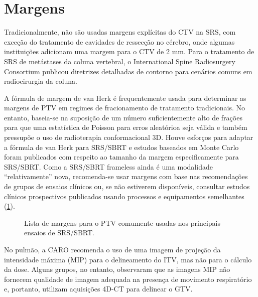 \documentclass[11pt,a4paper]{article}
\begin{document}
\section{Margens}

	Tradicionalmente, não são usadas margens explícitas do CTV na SRS, com exceção do tratamento de cavidades de ressecção no cérebro, onde algumas instituições adicionam uma margem para o CTV de 2 mm. Para o tratamento de SRS de metástases da coluna vertebral, o International Spine Radiosurgery Consortium publicou diretrizes detalhadas de contorno para cenários comuns em radiocirurgia da coluna. 

	A fórmula de margem de van Herk é frequentemente usada para determinar as margens de PTV em regimes de fracionamento de tratamento tradicionais. No entanto, baseia-se na suposição de um número suficientemente alto de frações para que uma estatística de Poisson para erros aleatórioa seja válida e também pressupõe o uso de radioterapia conformacional 3D. Houve esforços para adaptar a fórmula de van Herk para SRS/SBRT e estudos baseados em Monte Carlo\cite{herschtal2012calculating} foram publicados com respeito ao tamanho da margem especificamente para SRS/SBRT. Como a SRS/SBRT frameless ainda é uma modalidade ``relativamente'' nova, recomenda-se usar margens com base nas recomendações de grupos de ensaios clínicos ou, se não estiverem disponíveis, consultar estudos clínicos prospectivos publicados usando processos e equipamentos semelhantes (\ref{fig:srsMargens}).

	\begin{figure}[h]
		\centering
		\caption{Lista de margens para o PTV comumente usadas nos principais ensaios de SRS/SBRT.}
		\label{fig:srsMargens}
	\end{figure}

	No pulmão, a CARO recomenda o uso de uma imagem de projeção da intensidade máxima (MIP) para o delineamento do ITV, mas não para o cálculo da dose. Alguns grupos, no entanto, observaram que as imagens MIP não fornecem qualidade de imagem adequada na presença de movimento respiratório e, portanto, utilizam aquisições 4D-CT para delinear o GTV.
\end{document}
